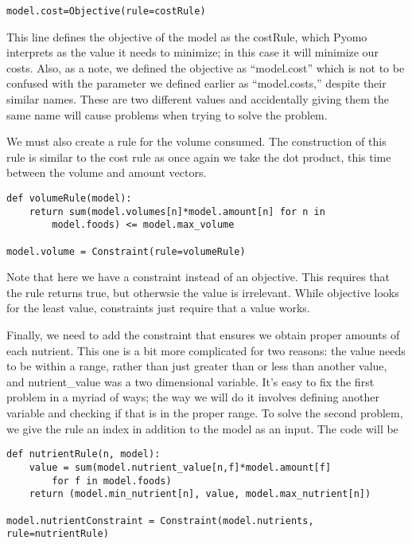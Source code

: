 \documentclass{article}
\begin{document}
\begin{verbatim}model.cost=Objective(rule=costRule) \end{verbatim}

This line defines the objective of the model as the costRule,  which Pyomo interprets as the value it needs to minimize; in this case it will minimize our costs.  Also, as a note, we defined the objective as ``model.cost'' which is not to be confused with the parameter we defined earlier as ``model.costs,'' despite their similar names.  These are two different values and accidentally giving them the same name will cause problems when trying to solve the problem.

We must also create a rule for the volume consumed.  The construction of this rule is similar to the cost rule as once again we take the dot product, this time between the volume and amount vectors. 

\begin{verbatim}def volumeRule(model):
    return sum(model.volumes[n]*model.amount[n] for n in 
        model.foods) <= model.max_volume

model.volume = Constraint(rule=volumeRule)
\end{verbatim}

Note that here we have a constraint instead of an objective.  This requires that the rule returns true, but otherwsie the value is irrelevant.  While objective looks for the least value, constraints just require that a value works.

Finally, we need to add the constraint that ensures we obtain proper amounts of each nutrient.  This one is a bit more complicated for two reasons: the value needs to be within a range, rather than just greater than or less than another value, and nutrient\_value was a two dimensional variable.  It's easy to fix the first problem in a myriad of ways; the way we will do it involves defining another variable and checking if that is in the proper range.  To solve the second problem, we give the rule an index in addition to the model as an input.  The code will be

\begin{verbatim}
def nutrientRule(n, model):
    value = sum(model.nutrient_value[n,f]*model.amount[f] 
        for f in model.foods)
    return (model.min_nutrient[n], value, model.max_nutrient[n])

model.nutrientConstraint = Constraint(model.nutrients, rule=nutrientRule)
\end{verbatim}
\end{document}
